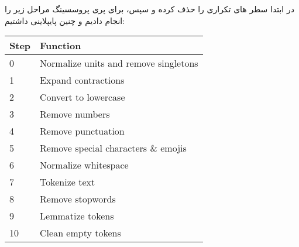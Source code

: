 \documentclass[a4paper,12pt]{article}
\begin{document}
	در ابتدا سطر های تکراری را حذف کرده و سپس، برای پری پروسسینگ مراحل زیر را انجام دادیم و چنین پایپلاینی داشتیم:
	\begin{latin}
		\begin{table}[H]
			\centering
			\begin{tabular}{|l|l|}
				\hline
				\textbf{Step} & \textbf{Function} \\
				\hline
				0 & Normalize units and remove singletons \\
				\hline
				1 & Expand contractions \\
				\hline
				2 & Convert to lowercase \\
				\hline
				3 & Remove numbers \\
				\hline
				4 & Remove punctuation \\
				\hline
				5 & Remove special characters \& emojis \\
				\hline
				6 & Normalize whitespace \\
				\hline
				7 & Tokenize text \\
				\hline
				8 & Remove stopwords \\
				\hline
				9 & Lemmatize tokens \\
				\hline
				10 & Clean empty tokens \\
				\hline
			\end{tabular}
			\label{tab:preprocessing_steps}
		\end{table}
	\end{latin}
	
\end{document}
